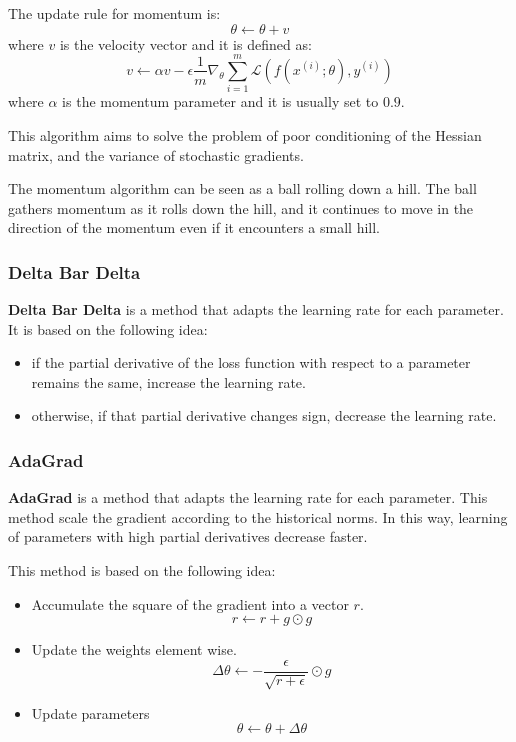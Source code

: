 The update rule for momentum is:
\begin{equation}
    \theta \gets \theta + v
\end{equation}
where $v$ is the velocity vector and it is defined as:
\begin{equation}
    v \gets \alpha v - \epsilon \frac{1}{m} \nabla_\theta \sum_{i=1}^m \mathcal{L}(f(x^{(i)}; \theta), y^{(i)})
\end{equation}
where $\alpha$ is the momentum parameter and it is usually set to $0.9$.

This algorithm aims to solve the problem of poor conditioning of the Hessian
matrix, and the variance of stochastic gradients.

The momentum algorithm can be seen as a ball rolling down a hill. The ball
gathers momentum as it rolls down the hill, and it continues to move in the
direction of the momentum even if it encounters a small hill.
\subsubsection{Delta Bar Delta}
\textbf{Delta Bar Delta} is a method that adapts the learning rate for each
parameter. It is based on the following idea:
\begin{itemize}
    \item if the partial derivative of the loss function with respect to a
          parameter remains the same, increase the learning rate.
    \item otherwise, if that partial derivative changes sign, decrease
          the learning rate.
\end{itemize}
\subsubsection{AdaGrad}
\textbf{AdaGrad} is a method that adapts the learning rate for each parameter.
This method scale the gradient according to the historical norms. In this way,
learning of parameters with high partial derivatives decrease faster.

This method is based on the following idea:
\begin{itemize}
    \item Accumulate the square of the gradient into a vector $r$.
          \begin{equation}
              r \gets r + g \odot g
          \end{equation}
    \item Update the weights element wise.
          \begin{equation}
              \Delta\theta \gets - \frac{\epsilon}{\sqrt{r + \epsilon}} \odot g
          \end{equation}
    \item Update parameters
          \begin{equation}
              \theta \gets \theta + \Delta \theta
          \end{equation}
\end{itemize}
